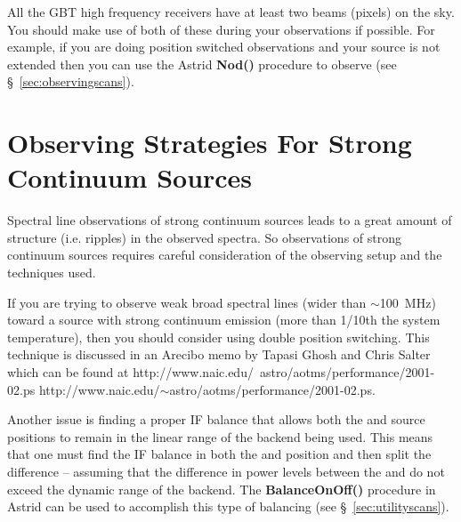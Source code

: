 All the \gls{GBT} high frequency receivers have at least two beams (pixels)
on the sky.  You should make use of both of these during your observations
if possible.  For example, if you are doing position switched observations
and your source is not extended then you can use the \gls{Astrid}
{\bfseries{\textcolor{pythonKeywords}{Nod()}}} procedure to observe (see
\S~\ref{sec:observingscans}).


\section[Observing Strategies For Strong Continuum Sources]
{Observing Strategies For Strong Continuum Sources}

Spectral line observations of strong continuum sources leads to a great
amount of structure (i.e. ripples) in the observed spectra. So observations of
strong continuum sources requires careful consideration of the observing
setup and the techniques used.

If you are trying to observe weak broad spectral lines (wider than
$\sim$100~MHz) toward a source with strong continuum emission (more than 1/10th
the system temperature), then you should consider using double position switching.
This technique is discussed in an Arecibo memo by Tapasi Ghosh and Chris Salter
which can be found at \htmladdnormallink
{http://www.naic.edu/~astro/aotms/performance/2001-02.ps}
{http://www.naic.edu/$\sim$astro/aotms/performance/2001-02.ps}.

Another issue is finding a proper \gls{IF} balance that allows both the 
and  source positions to remain in the linear range of the backend
being used.  This means that one must find the \gls{IF} balance in both the
 and  position and then split the difference -- assuming that
the difference in power levels between the  and  do not 
exceed the dynamic range of the backend.  The
{\bfseries{\textcolor{pythonKeywords}{BalanceOnOff()}}} procedure in
\gls{Astrid} can be used to accomplish this type of balancing
(see \S~\ref{sec:utilityscans}).














